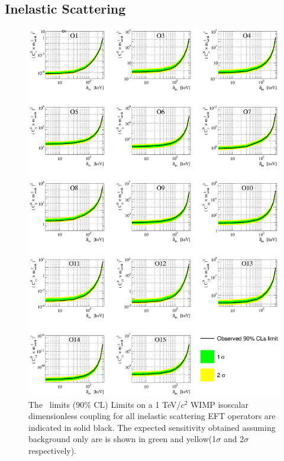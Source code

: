 \subsection{Inelastic Scattering}

\begin{figure}
\begin{minipage}{1.\linewidth}
\centerline{\includegraphics[width=1.\linewidth]{Figures/FinalInelastic.eps}}
\end{minipage}
\caption{The \Xehund\ limits (90\% CL) Limits on a 1 TeV/$c^2$ WIMP isoscalar dimensionless coupling for all inelastic scattering EFT operators are indicated in solid black. The expected sensitivity obtained assuming background only are is shown in green and yellow(1$\sigma$ and 2$\sigma$ respectively). }
\label{fig:elasticLimit}
\end{figure}

\FloatBarrier

